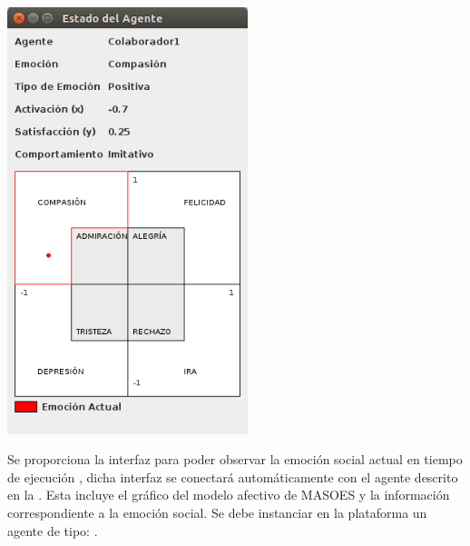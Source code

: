 \begin{ilustracion}[fuente=\yo, etiqueta=interfaz-estado-agente, titulo={Interfaz Para Observar el Estado Emocional Dado un Agente}]
\includegraphics[width=7cm]{ilustraciones/interfaces/estado-agente.png}
\end{ilustracion}


Se proporciona la interfaz  para poder observar la emoción social actual
en tiempo de ejecución , dicha interfaz se conectará automáticamente con el agente descrito en la .
Esta incluye el gráfico del modelo afectivo de MASOES y la información correspondiente a
la emoción social. Se debe instanciar en la plataforma un agente de tipo: .

